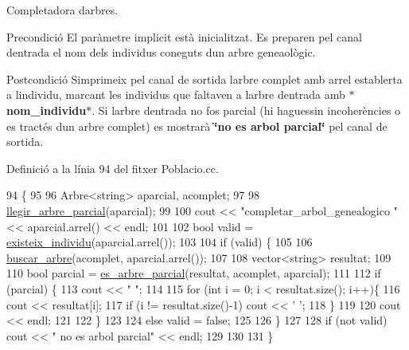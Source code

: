 Completadora d\textquotesingle{}arbres. 

\begin{DoxyPrecond}{Precondició}
El paràmetre implicit està inicialitzat. Es preparen pel canal d\textquotesingle{}entrada el nom dels individus coneguts d\textquotesingle{}un arbre geneaològic. 
\end{DoxyPrecond}
\begin{DoxyPostcond}{Postcondició}
S\textquotesingle{}imprimeix pel canal de sortida l\textquotesingle{}arbre complet amb arrel establerta a l\textquotesingle{}individu, marcant les individus que faltaven a l\textquotesingle{}arbre d\textquotesingle{}entrada amb {\bfseries $\ast$nom\+\_\+individu$\ast$}. Si l\textquotesingle{}arbre d\textquotesingle{}entrada no fos parcial (hi haguessin incoherències o es tractés d\textquotesingle{}un arbre complet) es mostrarà {\bfseries \char`\"{}no es arbol parcial\char`\"{}} pel canal de sortida. 
\end{DoxyPostcond}


Definició a la línia 94 del fitxer Poblacio.\+cc.


\begin{DoxyCode}
94                               \{
95     
96     Arbre<string> aparcial, acomplet;
97     
98     \hyperlink{class_poblacio_a0b60d947870b310929e4fc451b13ec01}{llegir\_arbre\_parcial}(aparcial);
99     
100     cout << \textcolor{stringliteral}{"completar\_arbol\_genealogico "} << aparcial.arrel() << endl;
101     
102     \textcolor{keywordtype}{bool} valid = \hyperlink{class_poblacio_ac32cb311f3b283b82adf3d0b7d82fbcc}{existeix\_individu}(aparcial.arrel());
103     
104     \textcolor{keywordflow}{if} (valid) \{
105     
106         \hyperlink{class_poblacio_ad35ab2cc93d5d79061e4bb4829ace045}{buscar\_arbre}(acomplet, aparcial.arrel());
107         
108         vector<string> resultat;
109         
110         \textcolor{keywordtype}{bool} parcial = \hyperlink{class_poblacio_a41f8178d145d0f41094b49256751d8c2}{es\_arbre\_parcial}(resultat, acomplet, aparcial);
111         
112         \textcolor{keywordflow}{if} (parcial) \{
113             cout << \textcolor{stringliteral}{"  "};
114             
115             \textcolor{keywordflow}{for} (\textcolor{keywordtype}{int} i = 0; i < resultat.size(); i++)\{
116                 cout << resultat[i];
117                 \textcolor{keywordflow}{if} (i != resultat.size()-1) cout << \textcolor{charliteral}{' '};
118             \}
119             
120             cout << endl;
121             
122         \}
123         
124         \textcolor{keywordflow}{else} valid = \textcolor{keyword}{false};
125     
126     \}
127     
128     \textcolor{keywordflow}{if} (not valid) cout << \textcolor{stringliteral}{"  no es arbol parcial"} << endl;
129     
130     
131 \}
\end{DoxyCode}
